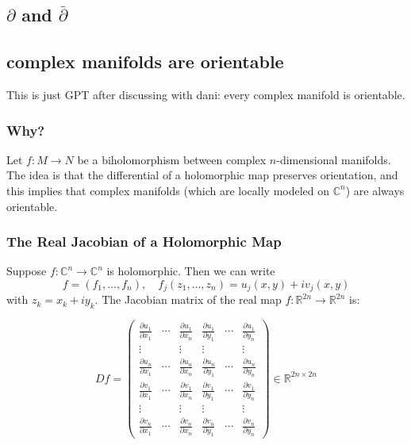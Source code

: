 \subsection{\(\partial\) and \(\bar\partial\)}


\subsection{complex manifolds are orientable}

This is just GPT after discussing with dani: every complex manifold is orientable.

\subsubsection*{Why?}

Let \( f: M \to N \) be a biholomorphism between complex \(n\)-dimensional manifolds. The idea is that the differential of a holomorphic map preserves orientation, and this implies that complex manifolds (which are locally modeled on \(\mathbb{C}^n\)) are always orientable.

\subsubsection*{The Real Jacobian of a Holomorphic Map}

Suppose \( f: \mathbb{C}^n \to \mathbb{C}^n \) is holomorphic. Then we can write
\[
f = (f_1, \dots, f_n), \quad f_j(z_1, \dots, z_n) = u_j(x, y) + i v_j(x, y)
\]
with \( z_k = x_k + i y_k \). The Jacobian matrix of the real map \( f: \mathbb{R}^{2n} \to \mathbb{R}^{2n} \) is:

\[
Df =
\begin{pmatrix}
\frac{\partial u_1}{\partial x_1} & \cdots & \frac{\partial u_1}{\partial x_n} & \frac{\partial u_1}{\partial y_1} & \cdots & \frac{\partial u_1}{\partial y_n} \\
\vdots & & \vdots & \vdots & & \vdots \\
\frac{\partial u_n}{\partial x_1} & \cdots & \frac{\partial u_n}{\partial x_n} & \frac{\partial u_n}{\partial y_1} & \cdots & \frac{\partial u_n}{\partial y_n} \\
\frac{\partial v_1}{\partial x_1} & \cdots & \frac{\partial v_1}{\partial x_n} & \frac{\partial v_1}{\partial y_1} & \cdots & \frac{\partial v_1}{\partial y_n} \\
\vdots & & \vdots & \vdots & & \vdots \\
\frac{\partial v_n}{\partial x_1} & \cdots & \frac{\partial v_n}{\partial x_n} & \frac{\partial v_n}{\partial y_1} & \cdots & \frac{\partial v_n}{\partial y_n}
\end{pmatrix}
\in \mathbb{R}^{2n \times 2n}
\]

